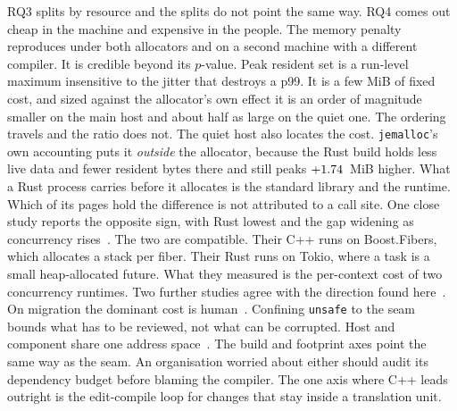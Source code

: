 \documentclass[english,twoside,openright,a4paper,censored,csm,software-track-2020]{HYthesisML}
\begin{document}
RQ3 splits by resource and the splits do not point the same way. RQ4 comes out cheap in
the machine and expensive in the people. The memory penalty reproduces under both
allocators and on a second machine with a different compiler. It is credible beyond its
$p$-value. Peak resident set is a run-level maximum insensitive to the jitter that
destroys a p99. It is a few MiB of fixed cost, and sized against the allocator's own
effect it is an order of magnitude smaller on the main host and about half as large on
the quiet one. The ordering travels and the ratio does not. The quiet host also locates
the cost. \texttt{jemalloc}'s own accounting puts it \emph{outside} the allocator,
because the Rust build holds less live data and fewer resident bytes there and still
peaks $+1.74$~MiB higher. What a Rust process carries before it allocates is the
standard library and the runtime. Which of its pages hold the difference is not
attributed to a call site. One close study reports the
opposite sign, with Rust lowest and the gap widening as concurrency
rises~\cite{karlback2021ran}. The two are compatible. Their C++ runs on Boost.Fibers,
which allocates a stack per fiber. Their Rust runs on Tokio, where a task is a small
heap-allocated future. What they measured is the per-context cost of two concurrency
runtimes. Two further studies agree with the direction found
here~\cite{olsson2023ranmgmt,sundvisson2026drivers}. On migration the dominant cost is
human~\cite{fulton2021adopting,crichton2024learning}. Confining \texttt{unsafe} to the
seam bounds what has to be reviewed, not what can be corrupted. Host and component share
one address space~\cite{rivera2021galeed,kirth2022pkrusafe}. The build and footprint axes
point the same way as the seam. An organisation worried about either should audit its
dependency budget before blaming the compiler. The one axis where C++ leads outright is
the edit-compile loop for changes that stay inside a translation unit.
\end{document}
